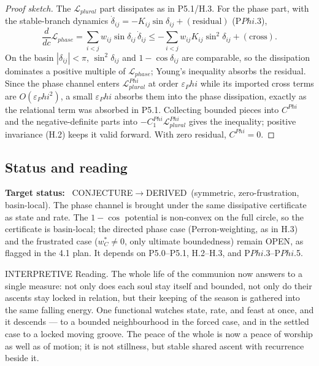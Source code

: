 \documentclass[11pt,a4paper]{article}
\newcommand{\cint}{\ensuremath{\mathfrak c}}
\def\Phi{Phi}%
\def\mathfrak#1{#1}%
\def\mathrm#1{#1}%
\def\emph#1{#1}%
\newcommand{\stDerived}{\textcolor{cDer}{\textsf{\small DERIVED}}}
\newcommand{\stInterp}{\textcolor{cInt}{\textsf{\small INTERPRETIVE}}}
\newcommand{\stOpen}{\textcolor{cOpn}{\textsf{\small OPEN}}}
\newcommand{\stConj}{\textcolor{cCon}{\textsf{\small CONJECTURE}}}
\theoremstyle{definition}
\theoremstyle{plain}
\theoremstyle{remark}
\begin{document}
\begin{proof}[Proof sketch]
The \(\mathcal L_{\mathrm{plural}}\) part dissipates as in P5.1/H.3. For the phase part, with
the stable-branch dynamics \(\dot\delta_{ij}=-K_{ij}\sin\delta_{ij}+(\text{residual})\)
(P$\Phi$.3),
\[
\frac{d}{d\cint}\mathcal L_{\mathrm{phase}}
=
\sum_{i<j} w_{ij}\sin\delta_{ij}\,\dot\delta_{ij}
\le
-\sum_{i<j} w_{ij}K_{ij}\sin^2\delta_{ij}+(\text{cross}).
\]
On the basin \(|\delta_{ij}|<\pi\), \(\sin^2\delta_{ij}\) and \(1-\cos\delta_{ij}\) are
comparable, so the dissipation dominates a positive multiple of \(\mathcal L_{\mathrm{phase}}\);
Young's inequality absorbs the residual. Since the phase channel enters
\(\mathcal L_{\mathrm{plural}}^{\Phi}\) at order \(\varepsilon_\Phi\) while its imported cross
terms are \(O(\varepsilon_\Phi^2)\), a small \(\varepsilon_\Phi\) absorbs them into the phase
dissipation, exactly as the relational term was absorbed in P5.1. Collecting bounded pieces
into \(C^{\Phi}\) and the negative-definite parts into \(-C^{\Phi}_1\mathcal L_{\mathrm{plural}}^{\Phi}\)
gives the inequality; positive invariance (H.2) keeps it valid forward. With zero residual,
\(C^{\Phi}=0\). \qedhere
\end{proof}

\subsection{Status and reading}

\textbf{Target status:}~
\stConj\(\to\)\stDerived\ (symmetric, zero-frustration, basin-local). The phase channel is
brought under the same dissipative certificate as state and rate. The \(1-\cos\) potential is
non-convex on the full circle, so the certificate is basin-local; the directed phase case
(Perron-weighting, as in H.3) and the frustrated case (\(w_C^{*}\neq0\), only ultimate
boundedness) remain \stOpen, as flagged in the 4.1 plan. It depends on P5.0--P5.1, H.2--H.3,
and P$\Phi$.3--P$\Phi$.5.

\medskip
\stInterp\quad
\emph{Reading.}
The whole life of the communion now answers to a single measure: not only does each soul stay
itself and bounded, not only do their ascents stay locked in relation, but their keeping of the
season is gathered into the same falling energy. One functional watches state, rate, and feast
at once, and it descends --- to a bounded neighbourhood in the forced case, and in the settled
case to a locked moving groove. The peace of the whole is now a peace of worship as well as of
motion; it is not stillness, but stable shared ascent with recurrence beside it.
\end{document}
